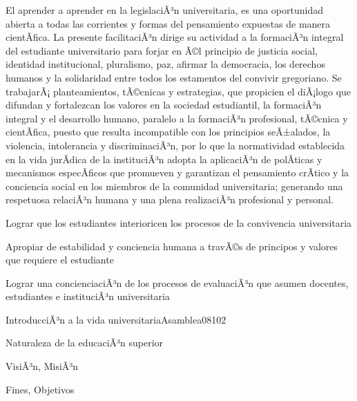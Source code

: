 \begin{syllabus}


\begin{justification}
El aprender a aprender en la legislaciÃ³n universitaria, es una oportunidad 
abierta a todas las corrientes y formas del pensamiento expuestas de manera 
cientÃ­fica. La presente facilitaciÃ³n dirige su actividad a la formaciÃ³n integral 
del estudiante universitario para forjar en Ã©l principio de justicia social, 
identidad institucional, pluralismo, paz, afirmar la democracia, los 
derechos humanos y la solidaridad entre todos los estamentos del convivir 
gregoriano. Se trabajarÃ¡ planteamientos, tÃ©cnicas y estrategias, que 
propicien el diÃ¡logo que difundan y fortalezcan los valores en la 
sociedad estudiantil, la formaciÃ³n integral y el desarrollo humano, 
paralelo a la formaciÃ³n profesional, tÃ©cnica y cientÃ­fica, puesto 
que resulta incompatible con los principios seÃ±alados, la violencia, 
intolerancia y discriminaciÃ³n, por lo que la normatividad establecida 
en la vida jurÃ­dica de la instituciÃ³n adopta la aplicaciÃ³n de polÃ­ticas 
y mecanismos especÃ­ficos que promueven y garantizan el pensamiento crÃ­tico 
y la conciencia social en los miembros de la comunidad universitaria; 
generando una respetuosa relaciÃ³n humana y una plena realizaciÃ³n 
profesional y personal.
\end{justification}

\begin{goals}
\item Lograr que los estudiantes interioricen los procesos de la convivencia universitaria
\item Apropiar de estabilidad y conciencia humana a travÃ©s de principos y valores que requiere el estudiante
\item Lograr una concienciaciÃ³n de los procesos de evaluaciÃ³n que asumen docentes, estudiantes e instituciÃ³n universitaria
\end{goals}

\begin{outcomes}
\end{outcomes}

\begin{unit}{IntroducciÃ³n a la vida universitaria}{Asamblea08}{10}{2}
   \begin{topics}
	\item Naturaleza de la educaciÃ³n superior
	\item VisiÃ³n, MisiÃ³n
	\item Fines, Objetivos
   \end{topics}


\end{unit}
\end{syllabus}
